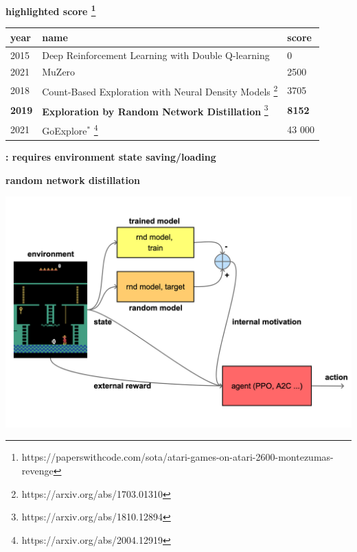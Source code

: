 \documentclass[xcolor=dvipsnames]{beamer}
\begin{document}
\begin{frame}{\bf highlighted score \footnote[0]{https://paperswithcode.com/sota/atari-games-on-atari-2600-montezumas-revenge} }

\begin{table}[]
\begin{tabular}{|l|l|l|}
\hline
\textbf{year} & \textbf{name}                                       & \textbf{score} \\ \hline
2015          & Deep Reinforcement Learning with Double Q-learning  & 0              \\ \hline
2021          & MuZero                                              & 2500           \\ \hline
2018          & Count-Based Exploration with Neural Density Models \footnote[1]{https://arxiv.org/abs/1703.01310}  & 3705           \\ \hline
\textbf{2019} & \textbf{Exploration by Random Network Distillation} \footnote[2]{https://arxiv.org/abs/1810.12894}& \textbf{8152}  \\ \hline
2021          & GoExplore$^*$ \footnote[3]{https://arxiv.org/abs/2004.12919}                         & 43 000         \\ \hline
\end{tabular}
\end{table}

{\bf * : requires environment state saving/loading}

\end{frame}




\begin{frame}{\bf random network distillation}

\centering
\includegraphics[scale=0.15]{../diagrams/rnd/rnd.png}

\end{frame}
\end{document}
